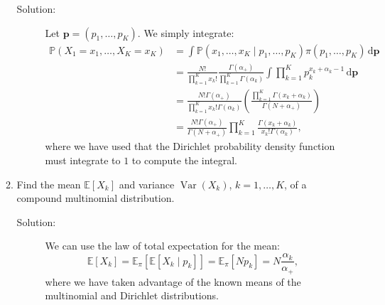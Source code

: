 \documentclass[letterpaper,11pt]{article}
\begin{document}
\begin{enumerate}
\begin{enumerate}
      \begin{description}
      \item[Solution:] Let $\mathbf{p} = \left(p_1,\ldots,p_K\right)$. We simply
        integrate:
        \begin{align*}
          \mathbb{P}\left(
          X_1 = x_1,\ldots,X_K = x_K
          \right)
          &=
            \int \mathbb{P}\left(
            x_1,\ldots,x_K \mid p_1,\ldots,p_K
            \right) \pi\left(p_1,\ldots,p_K\right)\,\mathrm{d}\mathbf{p} \\
          &= 
            \frac{N!}{\prod_{k=1}^Kx_k!}
            \frac{\Gamma\left(
            \alpha_+
            \right)}{\prod_{k=1}^K\Gamma\left(\alpha_k\right)}
            \int
            \prod_{k=1}^K p_k^{x_k + \alpha_k - 1}
            \,\mathrm{d}\mathbf{p} \\
          &= \frac{N!\Gamma\left(\alpha_+\right)}{\prod_{k=1}^Kx_k!\Gamma\left(\alpha_k\right)}\left(
            \frac{\prod_{k=1}^K\Gamma\left(x_k + \alpha_k\right)}{\Gamma\left(N + \alpha_+\right)}
            \right) \\
          &= \frac{N!\Gamma\left(\alpha_+\right)}{\Gamma\left(N + \alpha_+\right)}
            \prod_{k=1}^K\frac{\Gamma\left(x_k + \alpha_k\right)}{x_k!\Gamma\left(\alpha_k\right)},
        \end{align*}
        where we have used that the Dirichlet probability density function must
        integrate to $1$ to compute the integral.
      \end{description}
    \item Find the mean $\mathbb{E}\left[X_k\right]$ and variance
      $\operatorname{Var}\left(X_k\right)$, $k = 1,\ldots,K$, of a compound
      multinomial distribution.

      \begin{description}
      \item[Solution:] We can use the law of total expectation for the mean:
        \begin{equation}
          \mathbb{E}\left[
            X_k
          \right] =
          \mathbb{E}_\pi\left[
          \mathbb{E}\left[
            X_k \mid p_k
          \right]
        \right]
        =
        \mathbb{E}_\pi\left[Np_k
        \right]
        = N\frac{\alpha_k}{\alpha_+},
        \label{eqn:p3_cmult_expectation}
      \end{equation}
      where we have taken advantage of the known means of the multinomial and
      Dirichlet distributions.


\end{description}
\end{enumerate}
\end{enumerate}
\end{document}
